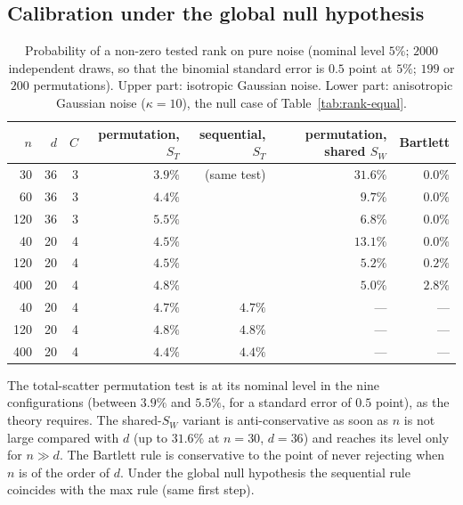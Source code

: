 \documentclass[11pt,a4paper]{article}
\theoremstyle{plain}
\theoremstyle{definition}
\theoremstyle{remark}
\begin{document}
\subsection{Calibration under the global null hypothesis}
\begin{table}[h]
\centering\small\renewcommand{\arraystretch}{1.1}
\caption{Probability of a non-zero tested rank on pure noise (nominal level $5\%$; $2000$ independent draws, so that the binomial standard error is $0.5$ point at $5\%$; $199$ or $200$ permutations). Upper part: isotropic Gaussian noise. Lower part: anisotropic Gaussian noise ($\kappa=10$), the null case of Table~\ref{tab:rank-equal}.}
\label{tab:rank-null}
\begin{tabular}{@{}rrrrrrr@{}}
\toprule
$n$ & $d$ & $C$ & permutation, $S_T$ & sequential, $S_T$ & permutation, shared $S_W$ & Bartlett \\
\midrule
30 & 36 & 3 & $3.9\%$ & (same test) & $31.6\%$ & $0.0\%$ \\
60 & 36 & 3 & $4.4\%$ & & $9.7\%$ & $0.0\%$ \\
120 & 36 & 3 & $5.5\%$ & & $6.8\%$ & $0.0\%$ \\
40 & 20 & 4 & $4.5\%$ & & $13.1\%$ & $0.0\%$ \\
120 & 20 & 4 & $4.5\%$ & & $5.2\%$ & $0.2\%$ \\
400 & 20 & 4 & $4.8\%$ & & $5.0\%$ & $2.8\%$ \\
\midrule
40 & 20 & 4 & $4.7\%$ & $4.7\%$ & --- & --- \\
120 & 20 & 4 & $4.8\%$ & $4.8\%$ & --- & --- \\
400 & 20 & 4 & $4.4\%$ & $4.4\%$ & --- & --- \\
\bottomrule
\end{tabular}
\end{table}
The total-scatter permutation test is at its nominal level in the nine
configurations (between $3.9\%$ and $5.5\%$, for a standard error of $0.5$
point), as the theory requires. The shared-$S_W$
variant is anti-conservative as soon as $n$ is not large compared with $d$
(up to $31.6\%$ at $n=30$, $d=36$) and reaches its level only for
$n\gg d$. The Bartlett rule is conservative to the point of never
rejecting when $n$ is of the order of $d$. Under the global null hypothesis
the sequential rule coincides with the max rule (same first step).
\end{document}
